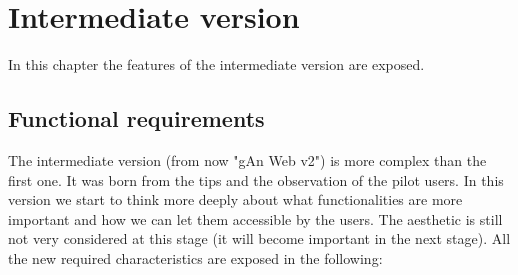 
\chapter{Intermediate version} %

\label{Chapter5} %

In this chapter the features of the intermediate version are exposed.

\section{Functional requirements}

The intermediate version (from now "gAn Web v2") is more complex than the first one. It was born from the tips and the observation of the pilot users. In this version we start to think more deeply about what functionalities are more important and how we can let them accessible by the users. The aesthetic is still not very considered at this stage (it will become important in the next stage). 
All the new required characteristics are exposed in the following:

